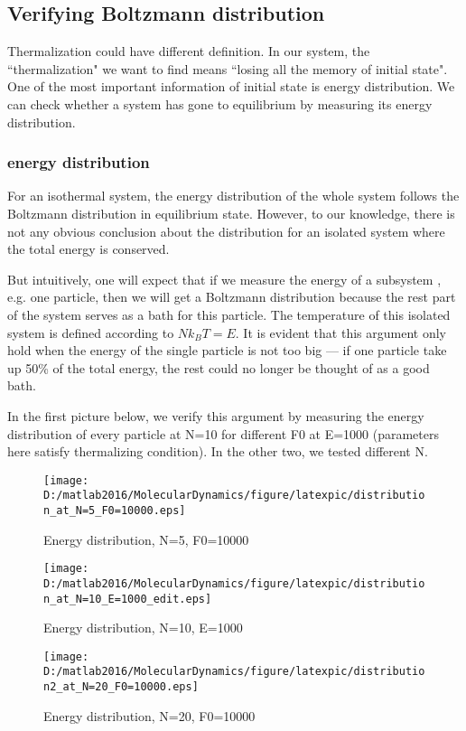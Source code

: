 \documentclass[aps,pre,twocolumn
,groupedaddress]{revtex4-1}
\begin{document}
\newpage
\subsection{Verifying Boltzmann distribution}
Thermalization could have different definition. In our system, the ``thermalization" we want to find means ``losing all the memory of initial state". One of the most important information of initial state is energy distribution. We can check whether a system has gone to equilibrium by measuring its energy distribution.

 
\subsubsection{energy distribution}
For an isothermal system, the energy distribution of the whole system follows the Boltzmann distribution in equilibrium state. However, to our knowledge, there is not any obvious conclusion about the distribution for an isolated system where the total energy is conserved.

But intuitively, one will expect that if we measure the energy of a subsystem , e.g. one particle, then we will get a Boltzmann distribution because the rest part of the system serves as a bath for this particle. The temperature of this isolated system is defined according to $Nk_BT=E$. It is evident that this argument only hold when the energy of the single particle is not too big --- if one particle take up 50\% of the total energy, the rest could no longer be thought of as a good bath.

In the first picture below, we verify this argument by measuring the energy distribution of every particle at N=10 for different F0 at E=1000 (parameters here satisfy thermalizing condition). In the other two, we tested different N.

\newpage
\begin{figure}[hbtp]
\centering
\texttt{[image: D:/matlab2016/MolecularDynamics/figure/latexpic/distribution\_at\_N=5\_F0=10000.eps]}
\caption{Energy distribution, N=5, F0=10000}
\label{fig:thermalization8}

\texttt{[image: D:/matlab2016/MolecularDynamics/figure/latexpic/distribution\_at\_N=10\_E=1000\_edit.eps]}
\caption{Energy distribution, N=10, E=1000}
\label{fig:thermalization9}

\texttt{[image: D:/matlab2016/MolecularDynamics/figure/latexpic/distribution2\_at\_N=20\_F0=10000.eps]} 
\caption{Energy distribution, N=20, F0=10000}
\label{fig:thermalization10}
\end{figure}
\end{document}
